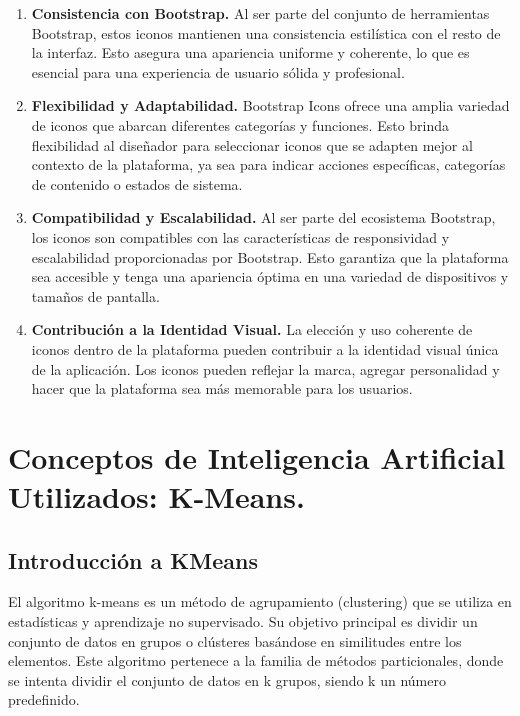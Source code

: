\documentclass{article}
\begin{document}
\begin{itemize}
\begin{enumerate}
                    \item \textbf{Consistencia con Bootstrap.} Al ser parte del conjunto de herramientas Bootstrap, estos iconos mantienen una consistencia estilística con el resto de la interfaz. Esto asegura una apariencia uniforme y coherente, lo que es esencial para una experiencia de usuario sólida y profesional.

                    \item \textbf{Flexibilidad y Adaptabilidad.} Bootstrap Icons ofrece una amplia variedad de iconos que abarcan diferentes categorías y funciones. Esto brinda flexibilidad al diseñador para seleccionar iconos que se adapten mejor al contexto de la plataforma, ya sea para indicar acciones específicas, categorías de contenido o estados de sistema.

                    \item \textbf{Compatibilidad y Escalabilidad.} Al ser parte del ecosistema Bootstrap, los iconos son compatibles con las características de responsividad y escalabilidad proporcionadas por Bootstrap. Esto garantiza que la plataforma sea accesible y tenga una apariencia óptima en una variedad de dispositivos y tamaños de pantalla.

                    \item \textbf{Contribución a la Identidad Visual.} La elección y uso coherente de iconos dentro de la plataforma pueden contribuir a la identidad visual única de la aplicación. Los iconos pueden reflejar la marca, agregar personalidad y hacer que la plataforma sea más memorable para los usuarios.
                \end{enumerate}
            \end{itemize}

\section{Conceptos de Inteligencia Artificial Utilizados: K-Means.}
\subsection{Introducción a KMeans}
    El algoritmo k-means es un método de agrupamiento (clustering) que se utiliza en estadísticas y aprendizaje no supervisado. Su objetivo principal es dividir un conjunto de datos en grupos o clústeres basándose en similitudes entre los elementos. Este algoritmo pertenece a la familia de métodos particionales, donde se intenta dividir el conjunto de datos en k grupos, siendo k un número predefinido.
\end{document}
